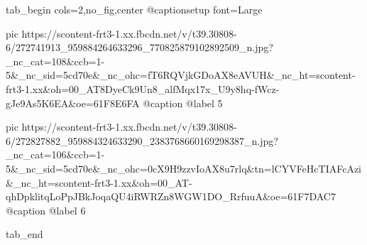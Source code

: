  
 
 
 
 


\ifcmt
  tab_begin cols=2,no_fig,center
     @captionsetup font=Large

     pic https://scontent-frt3-1.xx.fbcdn.net/v/t39.30808-6/272741913_959884264633296_770825879102892509_n.jpg?_nc_cat=108&ccb=1-5&_nc_sid=5cd70e&_nc_ohc=fT6RQVjkGDoAX8eAVUH&_nc_ht=scontent-frt3-1.xx&oh=00_AT8DyeCk9Un8_alfMqx17x_U9y8hq-fWcz-gJe9As5K6EA&oe=61F8E6FA
     @caption @label 5

     pic https://scontent-frt3-1.xx.fbcdn.net/v/t39.30808-6/272827882_959884324633290_2383768660169298387_n.jpg?_nc_cat=106&ccb=1-5&_nc_sid=5cd70e&_nc_ohc=0cX9H9zzvIoAX8u7rlq&tn=lCYVFeHcTIAFcAzi&_nc_ht=scontent-frt3-1.xx&oh=00_AT-qhDpklitqLoPpJBkJoqaQU4iRWRZn8WGW1DO_RrfuuA&oe=61F7DAC7
     @caption @label 6

  tab_end
\fi
